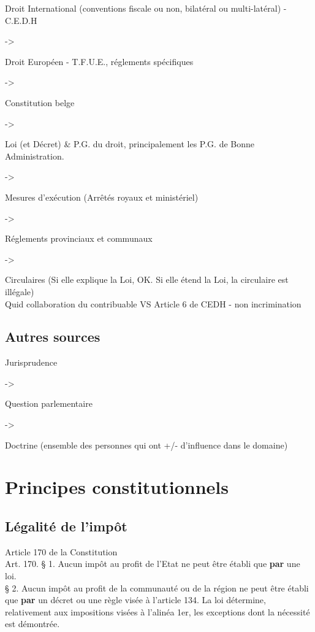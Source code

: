 \documentclass{book}
\begin{document}
Droit International (conventions fiscale ou non, bilatéral ou multi-latéral) - C.E.D.H

-> 

Droit Européen - T.F.U.E., réglements spécifiques

->

Constitution belge

-> 

Loi (et Décret) \& P.G. du droit, principalement les P.G. de Bonne Administration.

->

Mesures d'exécution (Arrêtés royaux et ministériel)

->

Réglements provinciaux et communaux

->

Circulaires (Si elle explique la Loi, OK. Si elle étend la Loi, la circulaire est illégale)\\


Quid collaboration du contribuable VS Article 6 de CEDH - non incrimination

\section{Autres sources}

Jurisprudence

->

Question parlementaire

-> 

Doctrine (ensemble des personnes qui ont +/- d'influence dans le domaine)

\chapter{Principes constitutionnels}

\section{Légalité de l'impôt}

Article 170 de la Constitution\\

Art. 170. § 1. Aucun impôt au profit de l'Etat ne peut être établi que \textbf{par} une loi.\\

  § 2. Aucun impôt au profit de la communauté ou de la région ne peut être établi que \textbf{par} un décret ou une règle visée à l'article 134. La loi détermine, relativement aux impositions visées à l'alinéa 1er, les exceptions dont la nécessité est démontrée.\\
\end{document}
